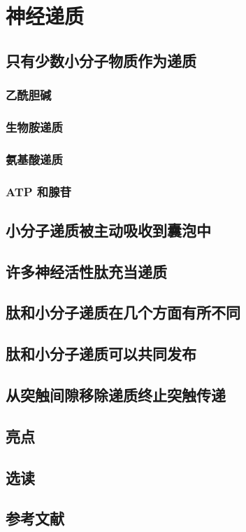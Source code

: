 \chapter{神经递质}

\section{只有少数小分子物质作为递质}
\subsection{乙酰胆碱}
\subsection{生物胺递质}
\subsection{氨基酸递质}
\subsection{ATP 和腺苷}

\section{小分子递质被主动吸收到囊泡中}

\section{许多神经活性肽充当递质}

\section{肽和小分子递质在几个方面有所不同}

\section{肽和小分子递质可以共同发布}

\section{从突触间隙移除递质终止突触传递}

\section{亮点}

\section{选读}

\section{参考文献}